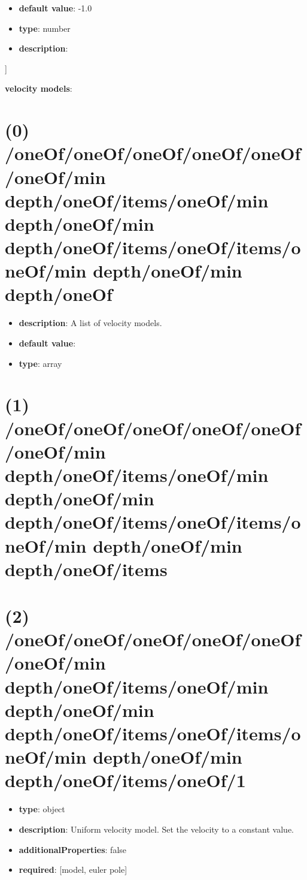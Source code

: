\begin{itemize}[leftmargin=1em]\item {\bf default value}: -1.0
\item {\bf type}: number
\item {\bf description}: 
\end{itemize}]\item {\bf velocity models}: \section{(0) /oneOf/oneOf/oneOf/oneOf/oneOf/oneOf/min depth/oneOf/items/oneOf/min depth/oneOf/min depth/oneOf/items/oneOf/items/oneOf/min depth/oneOf/min depth/oneOf}
\begin{itemize}[leftmargin=0em]\item {\bf description}: A list of velocity models.
\item {\bf default value}: 
\item {\bf type}: array
\end{itemize}\section{(1) /oneOf/oneOf/oneOf/oneOf/oneOf/oneOf/min depth/oneOf/items/oneOf/min depth/oneOf/min depth/oneOf/items/oneOf/items/oneOf/min depth/oneOf/min depth/oneOf/items}

\section{(2) /oneOf/oneOf/oneOf/oneOf/oneOf/oneOf/min depth/oneOf/items/oneOf/min depth/oneOf/min depth/oneOf/items/oneOf/items/oneOf/min depth/oneOf/min depth/oneOf/items/oneOf/1}
\begin{itemize}[leftmargin=2em]\item {\bf type}: object
\item {\bf description}: Uniform velocity model. Set the velocity to a constant value.
\item {\bf additionalProperties}: false
\item {\bf required}: [model, euler pole]\end{itemize}
